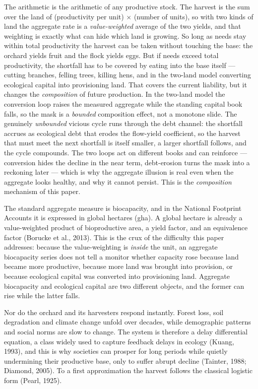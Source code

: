 \documentclass[11pt]{article}
\begin{document}
The arithmetic is the arithmetic of any productive stock. The harvest is the sum over the land of (productivity per unit) $\times$ (number of units), so with two kinds of land the aggregate rate is a \emph{value-weighted} average of the two yields, and that weighting is exactly what can hide which land is growing. So long as needs stay within total productivity the harvest can be taken without touching the base: the orchard yields fruit and the flock yields eggs. But if needs exceed total productivity, the shortfall has to be covered by eating into the base itself --- cutting branches, felling trees, killing hens, and in the two-land model converting ecological capital into provisioning land. That covers the current liability, but it changes the \emph{composition} of future production. In the two-land model the conversion loop raises the measured aggregate while the standing capital book falls, so the mask is a \emph{bounded} composition effect, not a monotone slide. The genuinely \emph{unbounded} vicious cycle runs through the debt channel: the shortfall accrues as ecological debt that erodes the flow-yield coefficient, so the harvest that must meet the next shortfall is itself smaller, a larger shortfall follows, and the cycle compounds. The two loops act on different books and can reinforce --- conversion hides the decline in the near term, debt-erosion turns the mask into a reckoning later --- which is why the aggregate illusion is real even when the aggregate looks healthy, and why it cannot persist. This is the \emph{composition} mechanism of this paper.

The standard aggregate measure is biocapacity, and in the National Footprint Accounts it is expressed in global hectares (gha). A global hectare is already a value-weighted product of bioproductive area, a yield factor, and an equivalence factor (Borucke et al., 2013). This is the crux of the difficulty this paper addresses: because the value-weighting is \emph{inside} the unit, an aggregate biocapacity series does not tell a monitor whether capacity rose because land became more productive, because more land was brought into provision, or because ecological capital was converted into provisioning land. Aggregate biocapacity and ecological capital are two different objects, and the former can rise while the latter falls.

Nor do the orchard and its harvesters respond instantly. Forest loss, soil degradation and climate change unfold over decades, while demographic patterns and social norms are slow to change. The system is therefore a delay differential equation, a class widely used to capture feedback delays in ecology (Kuang, 1993), and this is why societies can prosper for long periods while quietly undermining their productive base, only to suffer abrupt decline (Tainter, 1988; Diamond, 2005). To a first approximation the harvest follows the classical logistic form (Pearl, 1925).
\end{document}
